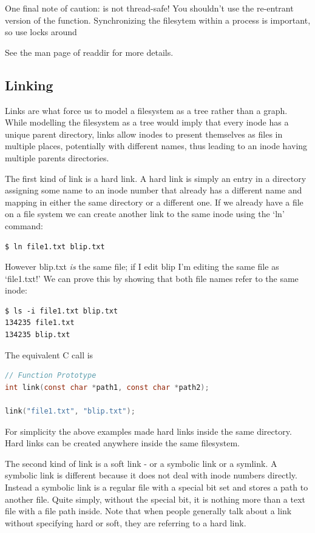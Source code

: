One final note of caution:  is not thread-safe!
You shouldn't use the re-entrant version of the function.
Synchronizing the filesytem within a process is important, so use locks around 

See the man page of readdir for more details.

\subsection{Linking}

Links are what force us to model a filesystem as a tree rather than a graph. While modelling the filesystem as a tree would imply that every inode has a unique parent directory, links allow inodes to present themselves as files in multiple places, potentially with different names, thus leading to an inode having multiple parents directories.

The first kind of link is a hard link. A hard link is simply an entry in a directory assigning some name to an inode number that already has a different name and mapping in either the same directory or a different one. If we already have a file on a file system we can create another link to the same inode using the `ln' command:

\begin{verbatim}
$ ln file1.txt blip.txt
\end{verbatim}

However blip.txt \emph{is} the same file; if I edit blip I'm editing the same file as `file1.txt!' We can prove this by showing that both file names refer to the same inode:

\begin{verbatim}
$ ls -i file1.txt blip.txt
134235 file1.txt
134235 blip.txt
\end{verbatim}

The equivalent C call is 

\begin{lstlisting}[language=C]
// Function Prototype
int link(const char *path1, const char *path2);

link("file1.txt", "blip.txt");
\end{lstlisting}

For simplicity the above examples made hard links inside the same directory. Hard links can be created anywhere inside the same filesystem.

The second kind of link is a soft link - or a symbolic link or a symlink. A symbolic link is different because it does not deal with inode numbers directly. Instead a symbolic link is a regular file with a special bit set and stores a path to another file. Quite simply, without the special bit, it is nothing more than a text file with a file path inside. Note that when people generally talk about a link without specifying hard or soft, they are referring to a hard link.

